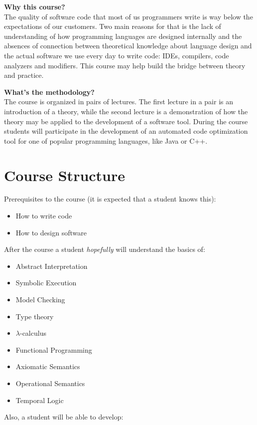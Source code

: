 \documentclass[nobrand,anonymous,nodate,nosecurity]{huawei}
\begin{document}
{\textbf{Why this course?}\\
The quality of software code that most of us programmers write is way below
the expectations of our customers. Two main reasons for that
is the lack of understanding of how programming languages are designed
internally and the absences of connection between theoretical knowledge
about language design and the actual software we use every day to
write code: IDEs, compilers, code analyzers and modifiers. This course
may help build the bridge between theory and practice.

\textbf{What's the methodology?}\\
The course is organized in pairs of lectures. The first lecture in a pair
is an introduction of a theory, while the second lecture is a demonstration
of how the theory may be applied to the development of a software tool. During
the course students will participate in the development of an automated
code optimization tool for one of popular programming languages, like Java or C++.

\newpage
\section*{Course Structure}

Prerequisites to the course (it is expected that a student knows this):

\begin{itemize}
\item How to write code
\item How to design software
\end{itemize}

After the course a student \emph{hopefully} will understand the basics of:

\begin{itemize}
\item Abstract Interpretation
\item Symbolic Execution
\item Model Checking
\item Type theory
\item $\lambda$-calculus
\item Functional Programming
\item Axiomatic Semantics
\item Operational Semantics
\item Temporal Logic
\end{itemize}

Also, a student will be able to develop:

}
\end{document}
